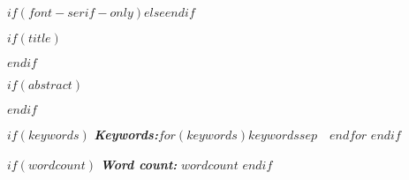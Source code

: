 $if(font-serif-only)$$else$\allsectionsfont{\sffamily}$endif$

$if(title)$
\maketitle
$endif$

$if(abstract)$
\begin{abstract}
$abstract$
\end{abstract}
$endif$

$if(keywords)$
\textbf{\textit{Keywords:}}\quad $for(keywords)$$keywords$$sep$~\textbullet~$endfor$
$endif$

$if(wordcount)$
\textbf{\textit{Word count:}} $wordcount$
$endif$
